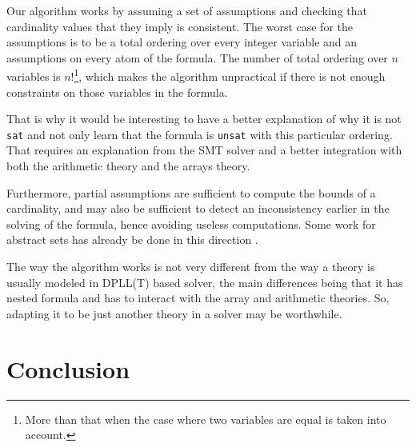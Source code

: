 \documentclass[]{article}
\begin{document}
Our algorithm works by assuming a set of assumptions and checking that
cardinality values that they imply is consistent. The worst case for the
assumptions is to be a total ordering over every integer variable and an
assumptions on every atom of the formula. The number of total ordering
over $n$ variables is
$n!$\footnote{More than that when the case where two variables are equal is taken into account.},
which makes the algorithm unpractical if there is not enough constraints
on those variables in the formula.

That is why it would be interesting to have a better explanation of why
it is not \texttt{sat} and not only learn that the formula is
\texttt{unsat} with this particular ordering. That requires an
explanation from the SMT solver and a better integration with both the
arithmetic theory and the arrays theory.

Furthermore, partial assumptions are sufficient to compute the bounds of
a cardinality, and may also be sufficient to detect an inconsistency
earlier in the solving of the formula, hence avoiding useless
computations. Some work for abstract sets has already be done in this
direction \cite{cardinalityset}.

The way the algorithm works is not very different from the way a theory
is usually modeled in DPLL(T) based solver, the main differences being
that it has nested formula and has to interact with the array and
arithmetic theories. So, adapting it to be just another theory in a
solver may be worthwhile.

\newpage

\section*{Conclusion}



\end{document}
